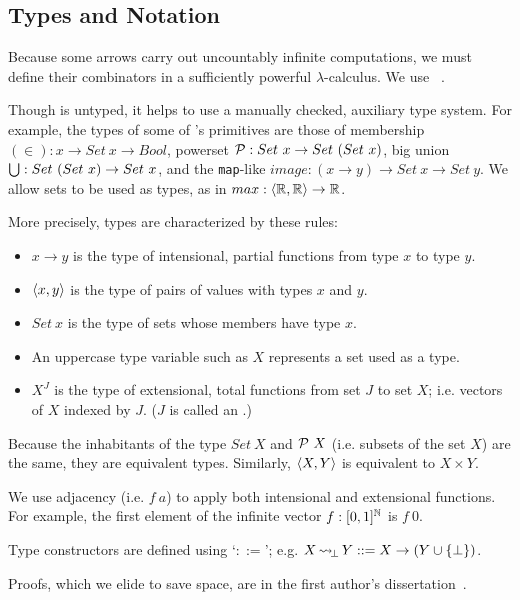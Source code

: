 \documentclass{llncs}
\newcommand{\arrow}{\rightsquigarrow}
\DeclareMathOperator{\botto}{{\arrow\mspace{-3mu}}_\bot}
\begin{document}
\subsection{Types and Notation}

Because some arrows carry out uncountably infinite computations, we must define their combinators in a sufficiently powerful $\lambda$-calculus.
We use \lzfclang~\cite{cit:toronto-2012flops-lzfc}.

Though \lzfclang is untyped, it helps to use a manually checked, auxiliary type system.
For example, the types of some of \lzfclang's primitives are those of membership $(\in) : x \to Set~x \to Bool$, powerset $\mathcal{P} : Set~x \to Set~(Set~x)$, big union $\textstyle\bigcup : Set~(Set~x) \to Set~x$, and the \texttt{map}-like $image : (x \to y) \to Set~x \to Set~y$.
We allow sets to be used as types, as in $max : \langle{\mathbb{R},\mathbb{R}}\rangle \to \mathbb{R}$.

More precisely, types are characterized by these rules:
\begin{itemize}
	\item $x \to y$ is the type of intensional, partial functions from type $x$ to type $y$.
	\item $\langle{x,y}\rangle$ is the type of pairs of values with types $x$ and $y$.
	\item $Set~x$ is the type of sets whose members have type $x$.
	\item An uppercase type variable such as $X$ represents a set used as a type.
	\item $X^J$ is the type of extensional, total functions from set $J$ to set $X$; i.e. vectors of $X$ indexed by $J$. ($J$ is called an .)
\end{itemize}
Because the inhabitants of the type $Set~X$ and $\mathcal{P}~X$ (i.e. subsets of the set $X$) are the same, they are equivalent types.
Similarly, $\langle{X,Y}\rangle$ is equivalent to $X \times Y$.

We use adjacency (i.e. $f~a$) to apply both intensional and extensional functions.
For example, the first element of the infinite vector $f : [0,1]^{\mathbb{N}}$ is $f~0$.

Type constructors are defined using `$::=$'; e.g. $X \botto Y ::= X \to (Y \u \set{\bot})$.

Proofs, which we elide to save space, are in the first author's dissertation~\cite{cit:toronto-thesis}.

\end{document}
